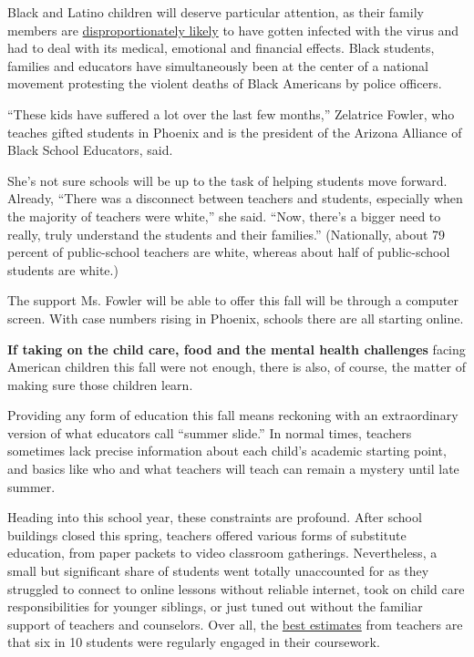 Black and Latino children will deserve particular attention, as their
family members are
\href{https://www.nytimes.com/interactive/2020/07/05/us/coronavirus-latinos-african-americans-cdc-data.html}{disproportionately
likely} to have gotten infected with the virus and had to deal with its
medical, emotional and financial effects. Black students, families and
educators have simultaneously been at the center of a national movement
protesting the violent deaths of Black Americans by police officers.

``These kids have suffered a lot over the last few months,'' Zelatrice
Fowler, who teaches gifted students in Phoenix and is the president of
the Arizona Alliance of Black School Educators, said.

She's not sure schools will be up to the task of helping students move
forward. Already, ``There was a disconnect between teachers and
students, especially when the majority of teachers were white,'' she
said. ``Now, there's a bigger need to really, truly understand the
students and their families.'' (Nationally, about 79 percent of
public-school teachers are white, whereas about half of public-school
students are white.)

The support Ms. Fowler will be able to offer this fall will be through a
computer screen. With case numbers rising in Phoenix, schools there are
all starting online.

\textbf{If taking on the child care, food and the mental health
challenges} facing American children this fall were not enough, there is
also, of course, the matter of making sure those children learn.

Providing any form of education this fall means reckoning with an
extraordinary version of what educators call ``summer slide.'' In normal
times, teachers sometimes lack precise information about each child's
academic starting point, and basics like who and what teachers will
teach can remain a mystery until late summer.

Heading into this school year, these constraints are profound. After
school buildings closed this spring, teachers offered various forms of
substitute education, from paper packets to video classroom gatherings.
Nevertheless, a small but significant share of students went totally
unaccounted for as they struggled to connect to online lessons without
reliable internet, took on child care responsibilities for younger
siblings, or just tuned out without the familiar support of teachers and
counselors. Over all, the
\href{https://www.chalkbeat.org/2020/6/26/21304405/surveys-remote-learning-coronavirus-success-failure-teachers-parents}{best
estimates} from teachers are that six in 10 students were regularly
engaged in their coursework.

